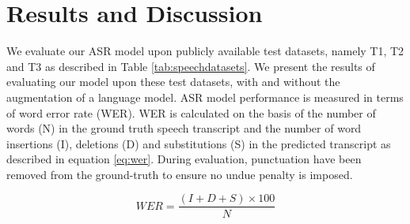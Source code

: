 \documentclass[runningheads]{llncs}
\begin{document}








\section{Results and Discussion}

We evaluate our ASR model upon publicly available test datasets, namely T1, T2 and T3 as described in Table \ref{tab:speechdatasets}.  We present the 
results of evaluating our model upon these test datasets, with and without the augmentation of a language model. ASR model performance is measured in terms of word error rate (WER). WER is calculated on the basis of the number of words (N) in the ground truth speech transcript and the number of word insertions (I), deletions (D) and  substitutions (S)  in the  predicted transcript as described in equation \ref{eq:wer}. During evaluation, punctuation have been removed from the ground-truth to ensure no undue penalty is imposed.

\begin{equation}
	\label{eq:wer}
	WER = \frac{(I+D+S) \times 100}{N}
\end{equation}
\end{document}
